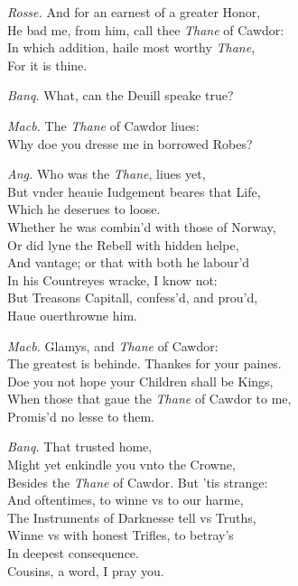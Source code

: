 \documentclass[12pt]{sides}
\newcommand{\dia}[1]{\hskip 15pt\textit{#1}\hskip 6pt}
\begin{document}
\begin{multicols}{2}
            \dia{Rosse.} And for an earnest of a greater Honor, \\ He bad me, from him, call thee \textit{Thane} of Cawdor: \\ In which addition, haile most worthy \textit{Thane}, \\ For it is thine.

            \dia{Banq.} What, can the Deuill speake true?

            \dia{Macb.} The \textit{Thane} of Cawdor liues: \\ Why doe you dresse me in borrowed Robes?

            \dia{Ang.} Who was the \textit{Thane}, liues yet, \\ But vnder heauie Iudgement beares that Life, \\ Which he deserues to loose. \\ Whether he was combin'd with those of Norway, \\ Or did lyne the Rebell with hidden helpe, \\ And vantage; or that with both he labour'd \\ In his Countreyes wracke, I know not: \\ But Treasons Capitall, confess'd, and prou'd, \\ Haue ouerthrowne him.

            \dia{Macb.} Glamys, and \textit{Thane} of Cawdor: \\ The greatest is behinde. Thankes for your paines. \\ Doe you not hope your Children shall be Kings, \\ When those that gaue the \textit{Thane} of Cawdor to me, \\ Promis'd no lesse to them.

            \dia{Banq.} That trusted home, \\ Might yet enkindle you vnto the Crowne, \\ Besides the \textit{Thane} of Cawdor. But 'tis strange: \\ And oftentimes, to winne vs to our harme, \\ The Instruments of Darknesse tell vs Truths, \\ Winne vs with honest Trifles, to betray's \\ In deepest consequence. \\ Cousins, a word, I pray you.


\end{multicols}
\end{document}
